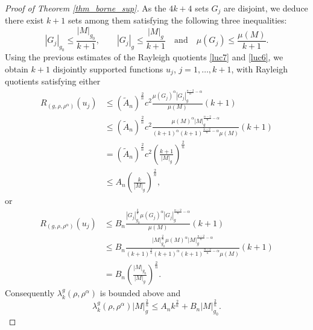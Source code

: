 \documentclass[12pt,reqno]{amsart}		%
\theoremstyle{plain}
\theoremstyle{definition}
\theoremstyle{remark}
\numberwithin{equation}{section}
\renewcommand{\d}{\mathrm{d}}
\begin{document}
\begin{proof}[Proof of Theorem \ref{thm_borne_sup}]
	As the $4k+4$ sets $G_{j}$ are disjoint, we deduce there exist $k+1$ sets among them satisfying the following three inequalities:
	\[
	|G_{j}|_{g_{0}}\leqslant \frac{|M|_{g_{0}}}{k+1}, \quad \quad |G_{j}|_{g}\leqslant \frac{|M|_{g}}{k+1}\quad \text{and} \quad\mu(G_{j})\leqslant \frac{\mu(M)}{k+1}.
	\]
	Using the previous estimates of the Rayleigh quotients \eqref{luc7} and \eqref{luc6}, we obtain $k+1$ disjointly supported functions $u_{j}$, $j=1,\dots,k+1$, with Rayleigh quotients satisfying either
	\begin{align*}
R_{(g,\rho,\rho^{\alpha})}(u_{j})
	&\leqslant \left(\tilde{A}_n\right)^{\frac{2}{n}}c^2
	\frac{\mu(G_{j})^{\alpha}|G_{j}|_{g}^{\frac{n-2}{n}-\alpha}}{\mu(M)}(k+1) \\
	&\leqslant \left(\tilde{A}_n\right)^{\frac{2}{n}}c^2
	\frac{\mu(M)^{\alpha}|M|_{g}^{\frac{n-2}{n}-\alpha}}{(k+1)^{\alpha}(k+1)^{\frac{n-2}{n}-\alpha}\mu(M)}(k+1) \\
	&= \left(\tilde{A}_n\right)^{\frac{2}{n}}c^2\left(\frac{k+1}{|M|_{g}}\right)^{\frac{2}{n}}\\
	&\leqslant A_n\left(\frac{k}{|M|_{g}}\right)^{\frac{2}{n}},
	\end{align*}
	or 
	\begin{align*}
R_{(g,\rho,\rho^{\alpha})}(u_{j})
	&\leqslant B_n\frac{|G_{j}|_{g_{0}}^{\frac{2}{n}}\mu(G_{j})^{\alpha}|G_{j}|_{g}^{\frac{n-2}{n}-\alpha}}{\mu(M)}(k+1) \\
	&\leqslant B_{n}\frac{|M|_{g_{0}}^{\frac{2}{n}}\mu(M)^{\alpha}|M|_{g}^{\frac{n-2}{n}-\alpha}}{(k+1)^{\frac{2}{n}}(k+1)^{\alpha}(k+1)^{\frac{n-2}{n}-\alpha}\mu(M)}(k+1) \\
	&= B_{n}\left(\frac{|M|_{g_{0}}}{|M|_{g}}\right)^{\frac{2}{n}}.
	\end{align*}
	Consequently $\lambda_{k}^{g}(\rho,\rho^{\alpha})$ is bounded above and
\begin{equation*}
\lambda^{g}_{k}(\rho,\rho^{\alpha})|M|_{g}^{\frac{2}{n}}\leqslant A_{n}k^{\frac{2}{n}}+B_{n}|M|_{g_{0}}^{\frac{2}{n}}.
\end{equation*}
\end{proof}
\end{document}
